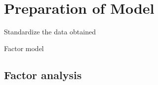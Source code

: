 \documentclass[12pt]{article}  %
\begin{document}
\section{Preparation of Model}

\item Standardize the data obtained

\item Factor model

















\subsection{Factor analysis}
\end{document}
